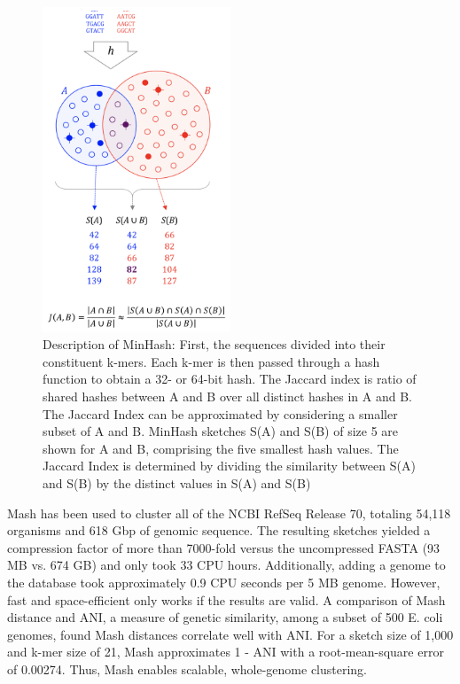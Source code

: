 \documentclass[12pt, letterpaper]{article}
\begin{document}
\begin{figure}[h!]
    \centering
    \includegraphics[width=0.5\textwidth]{Mash_description.png}
    \caption{Description of MinHash: First, the sequences divided into their constituent k-mers. Each k-mer is then passed through a hash function to obtain a 32- or 64-bit hash. The Jaccard index is ratio of shared hashes between A and B over all distinct hashes in A and B. The Jaccard Index can be approximated by considering a smaller subset of A and B. MinHash sketches S(A) and S(B) of size 5 are shown for A and B, comprising the five smallest hash values. The Jaccard Index is determined by dividing the similarity between S(A) and S(B) by the distinct values in S(A) and S(B)}
	\label{fig:MinHashDescription}
\end{figure}
Mash has been used to cluster all of the NCBI RefSeq Release 70, totaling 54,118 organisms and 618 Gbp of genomic sequence. The resulting sketches yielded a compression factor of more than 7000-fold versus the uncompressed FASTA (93 MB vs. 674 GB) and only took 33 CPU hours. Additionally, adding a genome to the database took approximately 0.9 CPU seconds per 5 MB genome. However, fast and space-efficient only works if the results are valid. A comparison of Mash distance and ANI, a  measure of genetic similarity, among a subset of 500 E. coli genomes, found Mash distances correlate well with ANI. For a sketch size of 1,000 and k-mer size of 21, Mash approximates 1 - ANI with a root-mean-square error of 0.00274. Thus, Mash enables scalable, whole-genome clustering. \\ \\
\end{document}

